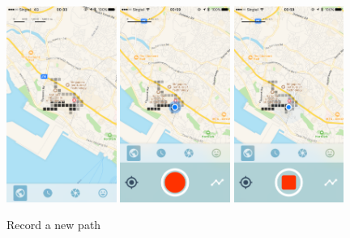 \documentclass[12pt,a4paper]{article}
\begin{document}
            \begin{figure}[H]
                \includegraphics[width=0.32\textwidth]{4-1-4-b}
                \includegraphics[width=0.32\textwidth]{2-2-a}
                \includegraphics[width=0.32\textwidth]{2-2-b}
                \centering
                \caption{Record a new path}
                \label{fig:record-new-path}
            \end{figure}
            
\end{document}
